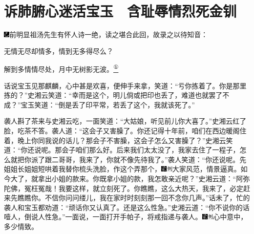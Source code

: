 

\chapter{诉肺腑心迷活宝玉　含耻辱情烈死金钏}
{\includegraphics[width=3mm]{../Images/00003}前明显祖汤先生有怀人诗一绝，读之堪合此回，故录之以待知音：}

{无情无尽却情多，情到无多得尽么？}

{解到多情情尽处，月中无树影无波。}\href{../Text/part0036_split_000.html\#lnkback_1_a}{\textsuperscript{①}}

话说宝玉见那麒麟，心中甚是欢喜，便伸手来拿，笑道：``亏你拣着了。你是那里拣的？''史湘云笑道：``幸而是这个，明儿倘或把印也丢了，难道也就罢了不成？''宝玉笑道：``倒是丢了印平常，若丢了这个，我就该死了。''

袭人斟了茶来与史湘云吃，一面笑道：``大姑娘，听见前儿你大喜了。''史湘云红了脸，吃茶不答。袭人道：``这会子又害臊了。你还记得十年前，咱们在西边暖阁住着，晚上你同我说的话儿？那会子不害臊，这会子怎么又害臊了？''史湘云笑道：``你还说呢。那会子咱们那么好。后来我们太太没了，我家去住了一程子，怎么就把你派了跟二哥哥，我来了，你就不像先待我了。''袭人笑道：``你还说呢。先姐姐长姐姐短哄着我替你梳头洗脸，作这个弄那个，{\includegraphics[width=3mm]{../Images/00006}\includegraphics[width=3mm]{../Images/00011}\footnotesize \kaishu 大家风范，情景逼真。}如今大了，就拿出小姐的款来。你既拿小姐的款，我怎敢亲近呢？''史湘云道：``阿弥陀佛，冤枉冤哉！我要这样，就立刻死了。你瞧瞧，这么大热天，我来了，必定赶来先瞧瞧你。不信你问问缕儿，我在家时时刻刻那一回不念你几声。''话未了，忙的袭人和宝玉都劝道：``顽话你又认真了。还是这么性急。''史湘云道：``你不说你的话噎人，倒说人性急。''一面说，一面打开手帕子，将戒指递与袭人。{\includegraphics[width=3mm]{../Images/00006}\includegraphics[width=3mm]{../Images/00011}\footnotesize \kaishu 心中意中，多少情致。}

